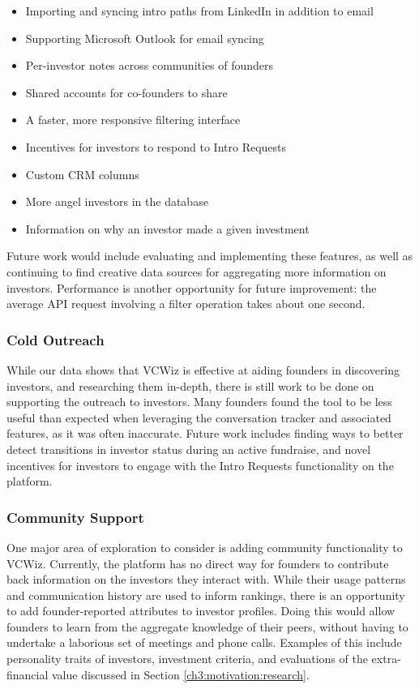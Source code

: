 \begin{itemize}
  \item Importing and syncing intro paths from LinkedIn in addition to email
  \item Supporting Microsoft Outlook for email syncing
  \item Per-investor notes across communities of founders
  \item Shared accounts for co-founders to share
  \item A faster, more responsive filtering interface
  \item Incentives for investors to respond to Intro Requests
  \item Custom CRM columns
  \item More angel investors in the database
  \item Information on why an investor made a given investment
\end{itemize}

Future work would include evaluating and implementing these features, as well as continuing to find creative data sources for aggregating more information on investors. Performance is another opportunity for future improvement: the average API request involving a filter operation takes about one second.

\subsubsection{Cold Outreach}

While our data shows that VCWiz is effective at aiding founders in discovering investors, and researching them in-depth, there is still work to be done on supporting the outreach to investors. Many founders found the tool to be less useful than expected when leveraging the conversation tracker and associated features, as it was often inaccurate. Future work includes finding ways to better detect transitions in investor status during an active fundraise, and novel incentives for investors to engage with the Intro Requests functionality on the platform.

\subsubsection{Community Support}

One major area of exploration to consider is adding community functionality to VCWiz. Currently, the platform has no direct way for founders to contribute back information on the investors they interact with. While their usage patterns and communication history are used to inform rankings, there is an opportunity to add founder-reported attributes to investor profiles. Doing this would allow founders to learn from the aggregate knowledge of their peers, without having to undertake a laborious set of meetings and phone calls. Examples of this include personality traits of investors, investment criteria, and evaluations of the extra-financial value discussed in Section \ref{ch3:motivation:research}.

